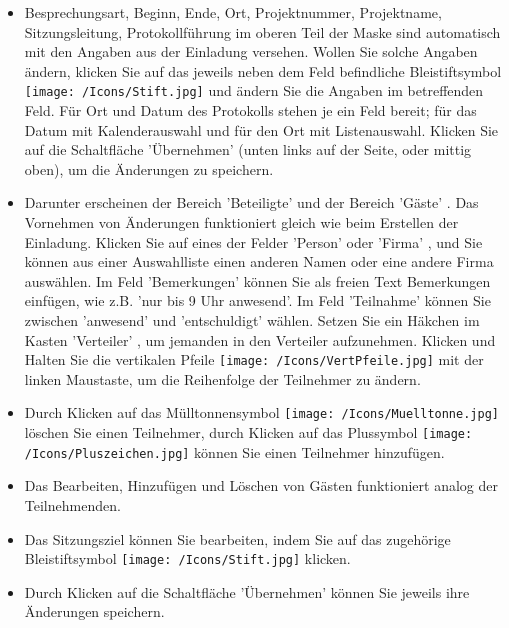 \begin{figure}[H]
\vspace{-15pt}  
\end{figure}

\begin{itemize}
\item
Besprechungsart, Beginn, Ende, Ort, Projektnummer, Projektname, Sitzungsleitung, Protokollführung im oberen Teil der Maske sind automatisch mit den Angaben aus der Einladung versehen. Wollen Sie solche Angaben ändern, klicken Sie auf das jeweils neben dem Feld befindliche Bleistiftsymbol \texttt{[image: /Icons/Stift.jpg]}  und ändern Sie die Angaben im betreffenden Feld. Für Ort und Datum des Protokolls stehen je ein Feld bereit; für das Datum mit Kalenderauswahl und für den Ort mit Listenauswahl. Klicken Sie auf die Schaltfläche 'Übernehmen'  (unten links auf der Seite, oder mittig oben), um die Änderungen zu speichern.
\item
Darunter erscheinen der Bereich 'Beteiligte' und der Bereich 'Gäste' . Das Vornehmen von Änderungen funktioniert gleich wie beim Erstellen der Einladung. Klicken Sie auf eines der Felder 'Person'  oder 'Firma' , und Sie können aus einer Auswahlliste einen anderen Namen oder eine andere Firma auswählen. Im Feld 'Bemerkungen'  können Sie als freien Text Bemerkungen einfügen, wie z.B. 'nur bis 9 Uhr anwesend'. Im Feld 'Teilnahme'  können Sie zwischen 'anwesend' und 'entschuldigt' wählen. Setzen Sie ein Häkchen im Kasten 'Verteiler' , um jemanden in den Verteiler aufzunehmen. Klicken und Halten Sie die vertikalen Pfeile \texttt{[image: /Icons/VertPfeile.jpg]}  mit der linken Maustaste, um die Reihenfolge der Teilnehmer zu ändern.
\item
Durch Klicken auf das Mülltonnensymbol \texttt{[image: /Icons/Muelltonne.jpg]}  löschen Sie einen Teilnehmer, durch Klicken auf das Plussymbol \texttt{[image: /Icons/Pluszeichen.jpg]}  können Sie einen Teilnehmer hinzufügen.
\item
Das Bearbeiten, Hinzufügen und Löschen von Gästen funktioniert analog der Teilnehmenden.
\item
Das Sitzungsziel können Sie bearbeiten, indem Sie auf das zugehörige Bleistiftsymbol \texttt{[image: /Icons/Stift.jpg]}  klicken.
\item
Durch Klicken auf die Schaltfläche 'Übernehmen'  können Sie jeweils ihre Änderungen speichern.
\end{itemize}

